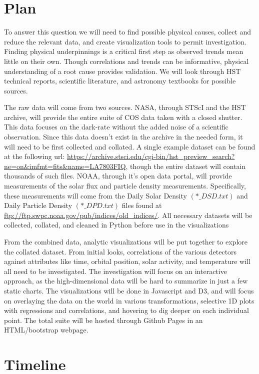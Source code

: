 \documentclass[a4paper,11pt]{article}
\begin{document}
\section{Plan}
To answer this question we will need to find possible physical causes, collect and reduce the relevant data, and create visualization tools to permit investigation.  Finding physical underpinnings is a critical first step as observed trends mean little on their own.  Though correlations and trends can be informative, physical understanding of a root cause provides validation.  We will look through HST technical reports, scientific literature, and astronomy textbooks for possible sources. 

The raw data will come from two sources.  NASA, through STScI and the HST archive, will provide the entire suite of COS data taken with a closed shutter.  This data focuses on the dark-rate without the added noise of a scientific observation.  Since this data doesn't exist in the archive in the needed form, it will need to be first collected and collated.  A single example dataset can be found at the following url: \url{https://archive.stsci.edu/cgi-bin/hst_preview_search?ne=on&imfmt=fits&name=LA7803FIQ}, though the entire dataset will contain thousands of such files.  NOAA, through it's open data portal, will provide measurements of the solar flux and particle density measurements.  Specifically, these measurements will come from the Daily Solar Density $(*\_DSD.txt)$ and Daily Particle Density $(*\_DPD.txt)$ files found at \url{ftp://ftp.swpc.noaa.gov/pub/indices/old_indices/}.  All necessary datasets will be collected, collated, and cleaned in Python before use in the visualizations

From the combined data, analytic visualizations will be put together to explore the collated dataset.  From initial looks, correlations of the various detectors against attributes like time, orbital position, solar activity, and temperature will all need to be investigated.  The investigation will focus on an interactive approach, as the high-dimensional data will be hard to summarize in just a few static charts.  The visualizations will be done in Javascript and D3, and will focus on overlaying the data on the world in various transformations, selective 1D plots with regressions and correlations, and hovering to dig deeper on each individual point.  The total suite will be hosted through Github Pages in an HTML/bootstrap webpage.  

\section{Timeline}
\end{document}
